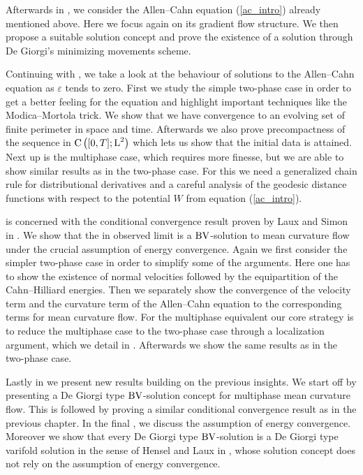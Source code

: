Afterwards in , we consider the Allen--Cahn 
equation 
(\ref{ac_intro}) already mentioned above. Here we focus again on its 
gradient flow structure. We then propose a suitable solution concept and prove 
the existence of a solution through De Giorgi's minimizing movements scheme.

Continuing with , we take a 
look at the behaviour of solutions to the Allen--Cahn equation as $ 
\varepsilon $ tends to zero. First we study the simple two-phase case in 
order 
to get a better feeling for the equation and highlight important techniques 
like the Modica--Mortola trick. We show that we have convergence to an 
evolving set of finite perimeter in space and time. 
Afterwards we also prove 
precompactness of the sequence in $ \operatorname{C} \left( [ 0 , T ] ; \operatorname{L}^{ 2 } \right) 
$ which 
lets us show that the initial data is attained. 
Next up is the multiphase case, 
which requires more finesse, but we are able to show similar results as 
in the 
two-phase case. 
For this we need a generalized chain rule for distributional 
derivatives and a careful analysis of the geodesic distance functions with 
respect to the potential $ W $ from equation (\ref{ac_intro}).

 is concerned with the conditional 
convergence result proven by Laux and Simon in 
\cite{convergence_of_allen_cahn_equation_to_multiphase_mean_curvature_flow}. 
We show that the in  
observed limit is a $ \operatorname{BV} $-solution to mean curvature flow under the crucial 
assumption of energy convergence. 
Again we first consider the simpler two-phase case in 
order to simplify some of the arguments. Here one has to show the existence of 
normal velocities followed by the equipartition of the Cahn--Hilliard energies. 
Then we separately show the convergence of the velocity term and the curvature 
term 
of the Allen--Cahn equation to the corresponding terms for mean curvature flow. 
For the multiphase equivalent our core strategy is to reduce the 
multiphase case to the two-phase 
case through a localization argument, which we detail in 
. 
Afterwards we show the same results as in the two-phase case.

Lastly in  we present new results 
building on the previous insights. We start off by presenting a De Giorgi type 
$ \operatorname{BV} $-solution concept for multiphase mean curvature flow. This is followed 
by proving a similar conditional convergence result as in the previous chapter. 
In the final 
, we discuss the 
assumption of energy convergence. Moreover we show that every De 
Giorgi type $ \operatorname{BV} $-solution is a De Giorgi type varifold solution in the sense 
of Hensel and Laux in 
\cite{hensel_laux_varifold_solution_concept_for_mean_curvature_flow}, whose 
solution concept does not rely on the assumption of energy convergence.






